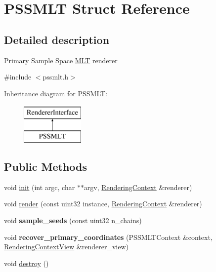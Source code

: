 \hypertarget{struct_p_s_s_m_l_t}{}\section{P\+S\+S\+M\+LT Struct Reference}
\label{struct_p_s_s_m_l_t}


\subsection{Detailed description}
Primary Sample Space \hyperlink{struct_m_l_t}{M\+LT} renderer 

{\ttfamily \#include $<$pssmlt.\+h$>$}

Inheritance diagram for P\+S\+S\+M\+LT\+:\begin{figure}[H]
\begin{center}
\leavevmode
\includegraphics[height=2.000000cm]{struct_p_s_s_m_l_t}
\end{center}
\end{figure}
\subsection*{Public Methods}
\begin{DoxyCompactItemize}
\item 
void \hyperlink{struct_p_s_s_m_l_t_a77d66c7cc0d195f62cedb29c15f845bd}{init} (int argc, char $\ast$$\ast$argv, \hyperlink{struct_rendering_context}{Rendering\+Context} \&renderer)
\item 
void \hyperlink{struct_p_s_s_m_l_t_a0eddc0de7c6a6120153f9be25b8b3a22}{render} (const uint32 instance, \hyperlink{struct_rendering_context}{Rendering\+Context} \&renderer)
\item 
\mbox{\label{struct_p_s_s_m_l_t_aa167d31942729aa757a22aa7750a471f}} 
void {\bfseries sample\+\_\+seeds} (const uint32 n\+\_\+chains)
\item 
\mbox{\label{struct_p_s_s_m_l_t_a3a9754da0e12b617448adaae2aca490d}} 
void {\bfseries recover\+\_\+primary\+\_\+coordinates} (P\+S\+S\+M\+L\+T\+Context \&context, \hyperlink{struct_rendering_context_view}{Rendering\+Context\+View} \&renderer\+\_\+view)
\item 
void \hyperlink{struct_p_s_s_m_l_t_a3dea533efa6d4ffd79e336131e83ba34}{destroy} ()
\end{DoxyCompactItemize}
